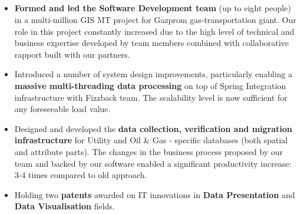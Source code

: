 \documentclass{res}
\newif\ifFullVersion
\begin{document}
\begin{resume}
\section{}
\vspace{15pt}
\begin{itemize}
\item {\bf Formed and led the Software Development team} (up to eight people) in a multi-million GIS MT project for Gazprom gas-transportation giant. Our role in this project constantly increased due to the high level of technical and business expertise developed by team members combined with collaborative rapport built with our partners.
\item Introduced a number of system design improvements, particularly enabling a {\bf massive multi-threading data processing} on top of Spring Integration infrastructure with Fizzback team. The scalability level is now sufficient for any foreseeable load value.
\item Designed and developed the {\bf data collection, verification and migration infrastructure} for Utility and Oil \& Gas - specific databases (both spatial and attribute parts). The changes in the business process proposed by our team and backed by our software enabled a significant productivity increase: 3-4 times compared to old approach.
\item Holding two {\bf patents} awarded on IT innovations in {\bf Data Presentation} and {\bf Data Visualisation} fields.
\ifFullVersion
\item As a {\bf Principal Developer / Architect} made a key contribution to the success of the PS\&E project when worked for Kring LLC. Despite unusual team configuration and inconvenient technology set the system showed {\bf good performance and reliability} achieved with a {\bf purpose-built testing facility}.
\item Built a set of the state- and local- {\bf budget data management tools} when worked in a large KPMG consultancy projects for the Ministry of Finance of Ukraine. The projects enjoyed the great success and were credited with eliminating 2 months from the budget development cycle and expanding the analytical capabilities of the Ministry of Finance.
\item A few times won the special prizes in {\bf ``Thinking Out of the Box''} during the traditional {\bf Hack Day} events in MapInfo / Pitney Bowes.
\fi
\end{itemize}

\vspace{8pt}

\end{resume}
\end{document}
